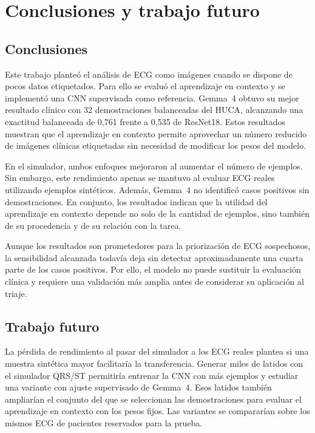 \chapter{Conclusiones y trabajo futuro}
\label{chap:conclusiones}

\section{Conclusiones}

Este trabajo planteó el análisis de ECG como imágenes cuando se dispone de pocos datos etiquetados. Para ello se evaluó el aprendizaje en contexto y se implementó una CNN supervisada como referencia. Gemma~4 obtuvo su mejor resultado clínico con 32 demostraciones balanceadas del HUCA, alcanzando una exactitud balanceada de 0,761 frente a 0,535 de ResNet18. Estos resultados muestran que el aprendizaje en contexto permite aprovechar un número reducido de imágenes clínicas etiquetadas sin necesidad de modificar los pesos del modelo.

En el simulador, ambos enfoques mejoraron al aumentar el número de ejemplos. Sin embargo, este rendimiento apenas se mantuvo al evaluar ECG reales utilizando ejemplos sintéticos. Además, Gemma~4 no identificó casos positivos sin demostraciones. En conjunto, los resultados indican que la utilidad del aprendizaje en contexto depende no solo de la cantidad de ejemplos, sino también de su procedencia y de su relación con la tarea.

Aunque los resultados son prometedores para la priorización de ECG sospechosos, la sensibilidad alcanzada todavía deja sin detectar aproximadamente una cuarta parte de los casos positivos. Por ello, el modelo no puede sustituir la evaluación clínica y requiere una validación más amplia antes de considerar su aplicación al triaje.

\vspace{-\baselineskip}
\section{Trabajo futuro}

La pérdida de rendimiento al pasar del simulador a los ECG reales plantea si una muestra sintética mayor facilitaría la transferencia. Generar miles de latidos con el simulador QRS/ST permitiría entrenar la CNN con más ejemplos y estudiar una variante con ajuste supervisado de Gemma~4. Esos latidos también ampliarían el conjunto del que se seleccionan las demostraciones para evaluar el aprendizaje en contexto con los pesos fijos. Las variantes se compararían sobre los mismos ECG de pacientes reservados para la prueba.

